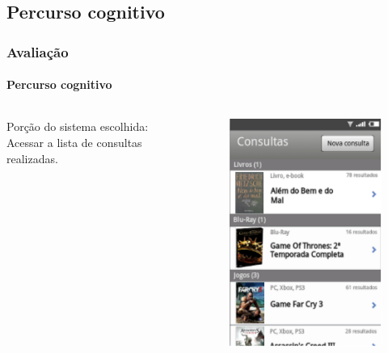 \documentclass[14pt,beamer]{beamer}
\begin{document}
\subsection{Percurso cognitivo}
\begin{frame}
	\frametitle{Avaliação}
	\framesubtitle{Percurso cognitivo}

    \begin{columns}
        \begin{column}{.6\textwidth}
            Porção do sistema escolhida: Acessar a lista de consultas realizadas.
        \end{column}
        \begin{column}{.4\textwidth}
            \begin{figure}
                \centering
                \includegraphics[scale=.5]{tela/TelaHistorico}
            \end{figure}
        \end{column}
    \end{columns}
\end{frame}
\end{document}

